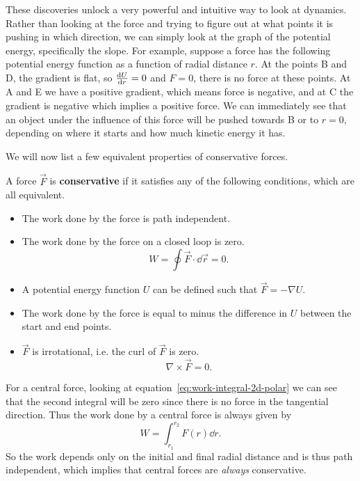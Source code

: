 \documentclass[../classical_mechanics.tex]{subfiles}
\begin{document}
        These discoveries unlock a very powerful and intuitive way to look at dynamics.
        Rather than looking at the force and trying to figure out at what points it is pushing in which direction, we can simply look at the graph of the potential energy, specifically the slope.
        For example, suppose a force has the following potential energy function as a function of radial distance $r$.
        At the points B and D, the gradient is flat, so $\dv{U}{r}=0$ and $F=0$, there is no force at these points.
        At A and E we have a positive gradient, which means force is negative, and at C the gradient is negative which implies a positive force.
        We can immediately see that an object under the influence of this force will be pushed towards B or to $r=0$, depending on where it starts and how much kinetic energy it has.

        We will now list a few equivalent properties of conservative forces.
        \begin{definition}\label{def:conservative-force}
            A force $\vec{F}$ is \textbf{conservative} if it satisfies any of the following conditions, which are all equivalent.
            \begin{itemize}
                \item The work done by the force is path independent.
                \item The work done by the force on a closed loop is zero.
                \begin{equation}
                    W=\oint\vec{F}\cdot\dd{\vec{r}}=0.
                \end{equation}
                \item A potential energy function $U$ can be defined such that $\vec{F}=-\nabla U$.
                \item The work done by the force is equal to minus the difference in $U$ between the start and end points.
                \item $\vec{F}$ is irrotational, i.e. the curl of $\vec{F}$ is zero.
                \begin{equation}
                    \nabla\times\vec{F}=0.
                \end{equation}
            \end{itemize}
        \end{definition}

        For a central force, looking at equation~\ref{eq:work-integral-2d-polar} we can see that the second integral will be zero since there is no force in the tangential direction.
        Thus the work done by a central force is always given by
        \begin{equation}
            W=\int_{r_1}^{r_2}F(r)\dd{r}.
        \end{equation}
        So the work depends only on the initial and final radial distance and is thus path independent, which implies that central forces are \textit{always} conservative.
\end{document}
